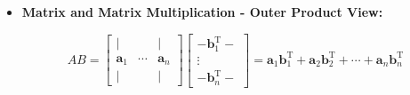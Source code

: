 \documentclass{article}
\begin{document}
\begin{itemize}
    \begin{equation}
        AB =
        \left[
            \begin{array}{c}
                - \mathbf{a}_1^{\mathrm{T}} - \\
                \vdots \\
                - \mathbf{a}_m^{\mathrm{T}} -
            \end{array}
        \right]
        \left[
            \begin{array}{ccc}
                | &        & | \\
                \mathbf{b}_1 & \cdots & \mathbf{b}_n \\
                | &        & |
            \end{array}
        \right]
        =
        \left[
            \begin{array}{ccc}
                \mathbf{a}_1^{\mathrm{T}} \mathbf{b}_1 & \cdots & \mathbf{a}_1^{\mathrm{T}} \mathbf{b}_n \\
                \vdots & \ddots & \vdots \\
                \mathbf{a}_m^{\mathrm{T}} \mathbf{b}_1 & \cdots & \mathbf{a}_m^{\mathrm{T}} \mathbf{b}_n
            \end{array}
        \right]
        \label{eq:mul_inner}
    \end{equation}

    \item \textbf{Matrix and Matrix Multiplication - Outer Product View:}

    \begin{equation}
        AB =
        \left[
            \begin{array}{ccc}
                | &        & | \\
                \mathbf{a}_1 & \cdots & \mathbf{a}_n \\
                | &        & |
            \end{array}
        \right]
        \left[
            \begin{array}{c}
                - \mathbf{b}_1^{\mathrm{T}} - \\
                \vdots \\
                - \mathbf{b}_n^{\mathrm{T}} -
            \end{array}
        \right]
        =
        \mathbf{a}_1 \mathbf{b}_1^{\mathrm{T}} + \mathbf{a}_2 \mathbf{b}_2^{\mathrm{T}} + \cdots + \mathbf{a}_n \mathbf{b}_n^{\mathrm{T}}
        \label{eq:mul_outer}
    \end{equation}


\end{itemize}
\end{document}
